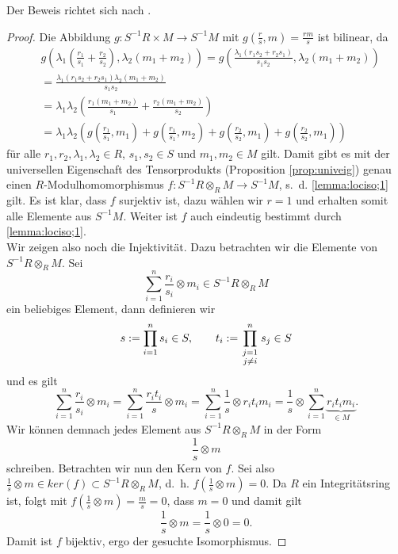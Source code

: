 \documentclass[11pt,titlepage]{article}
\theoremstyle{definition}
\theoremstyle{remark}
\begin{document}
	Der Beweis richtet sich nach \cite[Proposition 3.5]{introductiontocomalg}.
	
	\begin{proof}
		Die Abbildung $g:S^{-1}R\times M\to S^{-1}M$ mit $g\left(\frac{r}{s},m\right)=\frac{rm}{s}$ ist bilinear, da 
		\begin{align*}
			&g\left(\lambda_1\left(\frac{r_1}{s_1}+\frac{r_2}{s_2}\right),
			\lambda_2 (m_1+m_2)\right)=g\left(\frac{\lambda_1 (r_1 s_2+r_2
			 s_1)}{s_1s_2},\lambda_2(m_1+m_2)\right) \\
			&=\frac{\lambda_1(r_1s_2+r_2s_1)\lambda_2(m_1+m_2)}{s_1s_2}\\
			&=\lambda_1\lambda_2\left(\frac{r_1(m_1+m_2)}{s_1}+
			\frac{r_2(m_1+m_2)}{s_2}\right) \\
			&=\lambda_1\lambda_2 \left(g\left(\frac{r_1}{s_1},m_1\right)
			+g\left(\frac{r_1}{s_1},m_2\right)+g\left(\frac{r_2}{s_2},m_1\right)+
			g\left(\frac{r_2}{s_2},m_1\right)\right)
		\end{align*}
		für alle $r_1,r_2,\lambda_1,\lambda_2\in R$, $s_1,s_2 \in S$ und 
		$m_1,m_2\in M$ gilt. Damit gibt es mit der universellen Eigenschaft 
		des Tensorprodukts (Proposition \ref{prop:univeig}) genau einen 
		$R$-Modulhomomorphismus $f:S^{-1}R\otimes_R M\to S^{-1}M$, s.~d. 
		\ref{lemma:lociso;1} gilt. Es ist klar, dass $f$ surjektiv ist, 
		dazu wählen wir $r=1$ und erhalten somit alle Elemente aus 
		$S^{-1}M$. Weiter ist $f$ auch eindeutig bestimmt durch 
		\ref{lemma:lociso;1}. \\
		Wir zeigen also noch die Injektivität. Dazu betrachten wir die 
		Elemente von $S^{-1}R\otimes_R M$. Sei  
		\[\sum_{i=1}^n \frac{r_i}{s_i}\otimes m_i \in S^{-1}R\otimes_R M\]
		ein beliebiges Element, dann definieren wir
		\[s:=\prod_{i=1}^n s_i\in S,\qquad t_i:=\prod_{\genfrac{}{}{0pt}{1}{j=1}{j\neq i}}^n s_j\in S\]
		und es gilt 
		\[\sum_{i=1}^n \frac{r_i}{s_i}\otimes m_i =
		\sum_{i=1}^n \frac{r_it_i}{s}\otimes m_i =\sum_{i=1}^n 
		\frac{1}{s}\otimes r_i t_i m_i =\frac{1}{s}\otimes\sum_{i=1}^n
		\underbrace{r_it_im_i}_{\in M}.\]
		Wir können demnach jedes Element aus $S^{-1}R\otimes_R M$ in der Form 
		\[\frac{1}{s}\otimes m\]
		schreiben. Betrachten wir nun den Kern von $f$. Sei also 
		$\frac{1}{s}\otimes m \in ker(f)\subset S^{-1}R\otimes_R M$, d.~h. 
		$f\left(\frac{1}{s}\otimes m\right)=0$. Da $R$ ein 
		Integritätsring ist, folgt mit $f\left(\frac{1}{s}\otimes m\right)=\frac{m}{s}=0$, dass $m=0$ und damit gilt
		\[\frac{1}{s}\otimes m =\frac{1}{s}\otimes 0=0.\]
		Damit ist $f$ bijektiv, ergo der gesuchte Isomorphismus.
	\end{proof}
	
\end{document}
